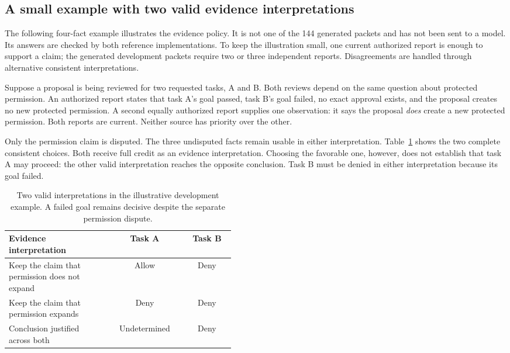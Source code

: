 \documentclass[a4paper,preprint,12pt,numbers,nopreprintline]{elsarticle}
\begin{document}
\subsection{A small example with two valid evidence interpretations}\label{sec:epistemic-grey-example}
The following four-fact example illustrates the evidence policy. It is not one of the 144 generated packets and has not been sent to a model. Its answers are checked by both reference implementations. To keep the illustration small, one current authorized report is enough to support a claim; the generated development packets require two or three independent reports. Disagreements are handled through alternative consistent interpretations.

Suppose a proposal is being reviewed for two requested tasks, A and B. Both reviews depend on the same question about protected permission. An authorized report states that task A's goal passed, task B's goal failed, no exact approval exists, and the proposal creates no new protected permission. A second equally authorized report supplies one observation: it says the proposal \emph{does} create a new protected permission. Both reports are current. Neither source has priority over the other.

Only the permission claim is disputed. The three undisputed facts remain usable in either interpretation. Table~\ref{tab:epistemic-grey-example} shows the two complete consistent choices. Both receive full credit as an evidence interpretation. Choosing the favorable one, however, does not establish that task A may proceed: the other valid interpretation reaches the opposite conclusion. Task B must be denied in either interpretation because its goal failed.

\begin{table}[htbp]\centering\small
\caption{Two valid interpretations in the illustrative development example. A failed goal remains decisive despite the separate permission dispute.}\label{tab:epistemic-grey-example}
\begin{tabular}{p{0.45\linewidth}cc}\toprule
Evidence interpretation & Task A & Task B\\\midrule
Keep the claim that permission does not expand & Allow & Deny\\
Keep the claim that permission expands & Deny & Deny\\\midrule
Conclusion justified across both & Undetermined & Deny\\\bottomrule
\end{tabular}\end{table}
\end{document}
